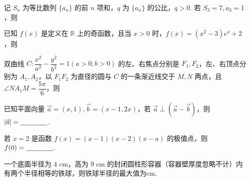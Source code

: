\documentclass[a4paper,11pt]{report}
\begin{document}
\begin{examquestions}[start=9]
\item 记 $S_n$ 为等比数列 $\{a_n\}$ 的前 $n$ 项和，$q$ 为 $\{a_n\}$ 的公比，$q>0$. 若 $S_3=7,a_3=1$，则
\item 已知 $f(x)$ 是定义在 $\mathbb R$ 上的奇函数，且当 $x>0$ 时，$f(x)=(x^2-3)e^x+2$，则
\item 双曲线 $C:\dfrac{x^2}{a^2}-\dfrac{y^2}{b^2}=1(a>0,b>0)$ 的左、右焦点分别是 $F_1,F_2$，左、右顶点分别为 $A_1,A_2$，以 $F_1F_2$ 为直径的圆与 $C$ 的一条渐近线交于 $M,N$ 两点，且 $\angle NA_1M=\dfrac{5\pi}{6}$，则
\end{examquestions}
\begin{examquestions}[start=12]
\item 已知平面向量 $\vec a=(x,1),\vec b=(x-1,2x)$，若 $\vec a\perp(\vec a-\vec b)$，则 $|\vec a|=\underline{\hspace{1.4cm}}$. 
\item 若 $x=2$ 是函数 $f(x)=(x-1)(x-2)(x-a)$ 的极值点，则 $f(0)=\underline{\hspace{1.4cm}}$. 
\item 一个底面半径为 $4\text{ cm}$，高为 $9\text{ cm}$ 的封闭圆柱形容器（容器壁厚度忽略不计）内有两个半径相等的铁球，则铁球半径的最大值为\blank $\text{cm}$. 
\end{examquestions}
\end{document}
